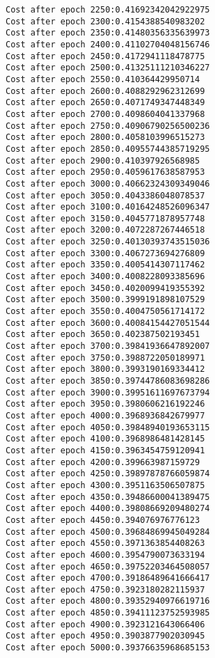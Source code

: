 \documentclass[11pt]{article}
\begin{document}
\begin{Verbatim}[commandchars=\\\{\}]
Cost after epoch 2250:0.41692342042922975
Cost after epoch 2300:0.4154388540983202
Cost after epoch 2350:0.41480356335639973
Cost after epoch 2400:0.41102704048156746
Cost after epoch 2450:0.4172941118478775
Cost after epoch 2500:0.41325111210346227
Cost after epoch 2550:0.410364429950714
Cost after epoch 2600:0.4088292962312699
Cost after epoch 2650:0.4071749347448349
Cost after epoch 2700:0.4098604041337968
Cost after epoch 2750:0.40906790256500236
Cost after epoch 2800:0.4058103996515273
Cost after epoch 2850:0.40955744385719295
Cost after epoch 2900:0.410397926568985
Cost after epoch 2950:0.4059617638587953
Cost after epoch 3000:0.40662324309349046
Cost after epoch 3050:0.4043386048078537
Cost after epoch 3100:0.40164248526096347
Cost after epoch 3150:0.4045771878957748
Cost after epoch 3200:0.4072287267446518
Cost after epoch 3250:0.40130393743515036
Cost after epoch 3300:0.4067273694276809
Cost after epoch 3350:0.4005414307117462
Cost after epoch 3400:0.4008228093385696
Cost after epoch 3450:0.4020099419355392
Cost after epoch 3500:0.3999191898107529
Cost after epoch 3550:0.4004750561714172
Cost after epoch 3600:0.40084154427051544
Cost after epoch 3650:0.402387502193451
Cost after epoch 3700:0.39841936647892007
Cost after epoch 3750:0.3988722050189971
Cost after epoch 3800:0.3993190169334412
Cost after epoch 3850:0.39744786083698286
Cost after epoch 3900:0.39951611697673794
Cost after epoch 3950:0.3980606216192246
Cost after epoch 4000:0.3968936842679977
Cost after epoch 4050:0.39848940193653115
Cost after epoch 4100:0.3968986481428145
Cost after epoch 4150:0.3963454759120941
Cost after epoch 4200:0.399663987159729
Cost after epoch 4250:0.39897878766059874
Cost after epoch 4300:0.3951163506507875
Cost after epoch 4350:0.39486600041389475
Cost after epoch 4400:0.39808669209480274
Cost after epoch 4450:0.394076976776123
Cost after epoch 4500:0.39684869945049284
Cost after epoch 4550:0.3971363854408263
Cost after epoch 4600:0.3954790073633194
Cost after epoch 4650:0.39752203464508057
Cost after epoch 4700:0.39186489641666417
Cost after epoch 4750:0.3923180282115937
Cost after epoch 4800:0.39352940976619716
Cost after epoch 4850:0.39411123752593985
Cost after epoch 4900:0.3923121643066406
Cost after epoch 4950:0.3903877902030945
Cost after epoch 5000:0.39376635968685153

    \end{Verbatim}

    \begin{center}
    \end{center}
    { \hspace*{\fill} \\}
    
\end{document}
